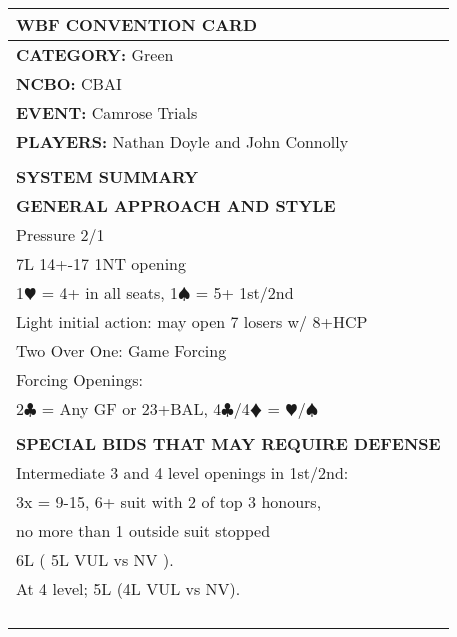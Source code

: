 \documentclass{article}
\newcommand\C{\ensuremath{\clubsuit}}
\newcommand\D{\color{red}\ensuremath{\vardiamondsuit}}
\renewcommand\H{\color{red}\ensuremath{\varheartsuit}}
\renewcommand\S{\ensuremath{\spadesuit}}
\newcommand\N{{\footnotesize NT}}
\begin{document}
\begin{minipage}{5mm}
	\begin{tabular}{| p{5mm} |}
	\end{tabular}
\end{minipage}
\begin{minipage}{90mm}
	\begin{tabular}{| p{88mm} |}
		\hline
		\cellcolor{green!25} \textbf{WBF CONVENTION CARD} \\ \hline
		\textbf{CATEGORY:} Green\\
		\textbf{NCBO:} CBAI\\
		\textbf{EVENT:} Camrose Trials\\
		\textbf{PLAYERS:} Nathan Doyle and John Connolly\\
		\multirow{2}{*}{} \\
		\\
		\hline \cellcolor{green!25} \textbf{SYSTEM SUMMARY} \\ \hline
		\cellcolor{orange!25}\textbf{GENERAL APPROACH AND STYLE} \\ \hline
		Pressure 2/1\\ \hline
		7L 14+-17 1{\N} opening\\ \hline
		1{\H} = 4+ in all seats, 1{\S} = 5+ 1st/2nd\\ \hline
		Light initial action: may open 7 losers w/ 8+HCP\\ \hline
		Two Over One: Game Forcing\\ \hline
		Forcing Openings:\\ \hline
		{2\C} = Any GF or 23+BAL, 4{\C}/4{\D} = {\H}/{\S} \\ \hline
		\\ \hline
		\cellcolor{orange!25}\textbf{SPECIAL BIDS THAT MAY REQUIRE DEFENSE} \\ \hline
		Intermediate 3 and 4 level openings in 1st/2nd: \\ \hline
		3x = 9-15, 6+ suit with 2 of top 3 honours,\\ \hline
		no more than 1 outside suit stopped\\ \hline
		6L ( 5L VUL vs NV ).\\ \hline
		At 4 level; 5L (4L VUL vs NV). \\ \hline
		\\ \hline
		\\ \hline
		\\ \hline
		\\ \hline

\end{tabular}
\end{minipage}
\end{document}
